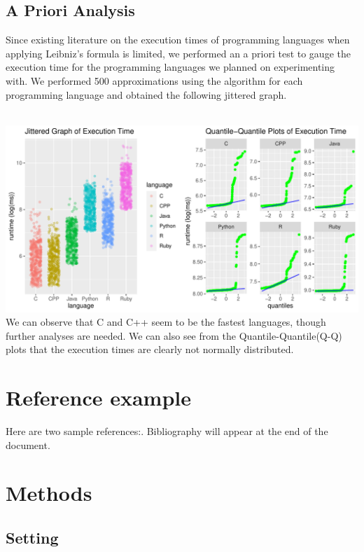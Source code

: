 \documentclass[12pt,halfline,a4paper,]{ouparticle}
\begin{document}
\hypertarget{a-priori-analysis}{%
\subsection{A Priori Analysis}\label{a-priori-analysis}}

Since existing literature on the execution times of programming
languages when applying Leibniz's formula is limited, we performed an a
priori test to gauge the execution time for the programming languages we
planned on experimenting with. We performed 500 approximations using the
algorithm for each programming language and obtained the following
jittered graph.\\
\strut \\

\includegraphics[width=1\linewidth]{skeleton_files/figure-latex/figPrior-1}
We can observe that C and C++ seem to be the fastest languages, though
further analyses are needed. We can also see from the
Quantile-Quantile(Q-Q) plots that the execution times are clearly not
normally distributed.

\newpage

\hypertarget{reference-example}{%
\section{Reference example}\label{reference-example}}

Here are two sample references:. Bibliography will appear at the end of
the document.

\hypertarget{methods}{%
\section{Methods}\label{methods}}

\hypertarget{setting}{%
\subsection{Setting}\label{setting}}
\end{document}
